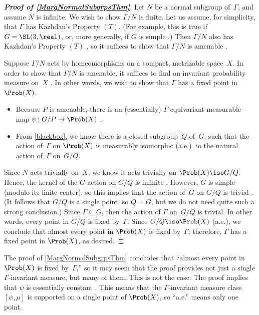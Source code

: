 \begin{proof}[\textbf{\upshape Proof of \cref{MargNormalSubgrpsThm}}]
Let $N$ be a normal subgroup of~$\Gamma$, and assume $N$ is infinite. We wish to show $\Gamma/N$ is finite.  
Let us assume, for simplicity, that $\Gamma$ has Kazhdan's Property $(T)$. (For example, this is true if $G = \SL(3,\real)$, or, more generally, if $G$ is simple .)
Then $\Gamma/N$ also has Kazhdan's Property $(T)$ , so it suffices to show that $\Gamma/N$ is amenable .

Suppose $\Gamma/N$ acts by homeomorphisms on a compact, metrizable space~$X$.
In order to show that $\Gamma/N$ is amenable, it suffices to find an invariant probability measure on~$X$ . In other words, we wish to show that $\Gamma$ has a fixed point in $\Prob(X)$.
\begin{itemize}
\item Because $P$ is amenable, there is an (essentially) $\Gamma$-equivariant measurable map $\psi \colon G/P \to \Prob(X)$ .
\item From \cref{blackbox}, we know there is a closed subgroup~$Q$ of~$G$, such that the action of~$\Gamma$ on $\Prob(X)$ is measurably isomorphic (a.e.)\  to the natural action of~$\Gamma$ on~$G/Q$.
 \end{itemize}
 Since $N$ acts trivially on~$X$, we know it acts trivially on $\Prob(X) \iso G/Q$.
Hence, the kernel of the $G$-action on $G/Q$ is infinite .
However, $G$ is simple (modulo its finite center), 
 so this implies that the action of~$G$ on $G/Q$ is trivial . 
 (It follows that $G/Q$ is a single point, so $Q = G$, but we do not need quite such a strong conclusion.) Since $\Gamma \subseteq G$, then the action of $\Gamma$ on~$G/Q$ is trivial. In other words, every point in $G/Q$ is fixed by~$\Gamma$.
 Since $G/Q \iso \Prob(X)$ (a.e.), we conclude that almost every point in $\Prob(X)$ is fixed by~$\Gamma$; therefore, $\Gamma$ has a fixed point in $\Prob(X)$, as desired.
 \end{proof}

\begin{rem} \label{AE1Pt}
The proof of \cref{MargNormalSubgrpsThm} concludes that ``almost every point in $\Prob(X)$ is fixed by~$\Gamma$\zz,'' so it may seem that the proof provides not just a single $\Gamma$-invariant measure, but many of them. This is not the case: The proof implies that $\psi$ is essentially constant . This means that the $\Gamma$-invariant measure class $[\psi_* \mu]$ is supported on a single point of $\Prob(X)$, so ``a.e\zz.'' means only one point.
\end{rem}

